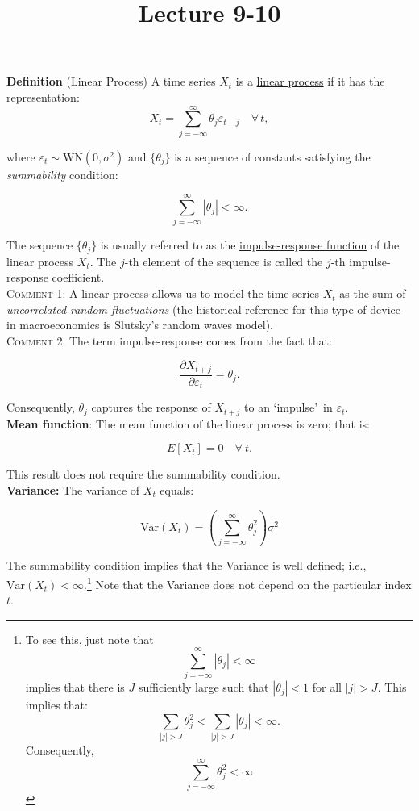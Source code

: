 \documentclass[12] {article}
\begin{document}
\onehalfspace

\title{Lecture 9-10}
\date{}
\maketitle


\textbf{Definition} (Linear Process) A time series $X_t$ is a \underline{linear process} if it has the representation:
\[ X_t = \sum_{j=-\infty}^{\infty} \theta_j \varepsilon_{t-j} \quad \forall \, t, \] 

\noindent where $\varepsilon_t \sim \textrm{WN}(0,\sigma^2)$ and $\{ \theta_j \}$ is a sequence of constants satisfying the \emph{summability} condition:

\[ \sum_{j=-\infty}^{\infty} |\theta_j| < \infty. \]

\noindent The sequence $\{\theta_j\}$ is usually referred to as the \underline{impulse-response function} of the linear process $X_t$. The $j$-th element of the sequence is called the $j$-th impulse-response coefficient.  \\

{\scshape Comment 1:} A linear process allows us to model the time series $X_t$ as the sum of \emph{uncorrelated random fluctuations} (the historical reference for this type of device in macroeconomics is Slutsky\textquoteright s random waves model). \\

{\scshape Comment 2:} The term impulse-response comes from the fact that:

\[ \frac{\partial X_{t+j} }{\partial \varepsilon_{t} } = \theta_j. \]

\noindent Consequently, $\theta_j$ captures the response of $X_{t+j}$ to an `impulse\textquoteright \, in $\varepsilon_{t}$. \\



\noindent \textbf{Mean function}: The mean function of the linear process is zero; that is:

\[ E[X_t] = 0 \quad \forall \: t. \]

\noindent This result does not require the summability condition. \\

\noindent \textbf{Variance:} The variance of $X_t$ equals:

\[ \textrm{Var}(X_t) = \left( \sum_{j=-\infty}^{\infty} \theta_j^2 \right) \sigma^2  \]

\noindent The summability condition implies that the Variance is well defined; i.e., $\textrm{Var}(X_t) < \infty$.\footnote{To see this, just note that 
\[ \sum_{j=-\infty}^{\infty} | \theta_j| < \infty  \]
implies that there is $J$ sufficiently large such that $|\theta_j| < 1$ for all $|j| > J$. This implies that:
\[ \sum_{|j|>J} \theta_j^2 < \sum_{|j|>J} | \theta_j | < \infty.  \]
Consequently,   
\[ \sum_{j=-\infty}^{\infty} \theta_j^2 < \infty  \] } 
Note that the Variance does not depend on the particular index $t$. \\
\end{document}

